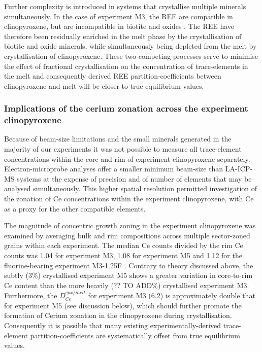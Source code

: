 \documentclass[final,authoryear,3p,times,twocolumn]{elsarticle}
\begin{document}
    Further complexity is introduced in systems that crystallise multiple minerals simultaneously. In the case of experiment M3, the REE are compatible in clinopyroxene, but are incompatible in biotite and oxides \citep[e.g.][]{Mahood1990,Schmidt1999}. The REE have therefore been residually enriched in the melt phase by the crystallisation of biotite and oxide minerals, while simultaneously being depleted from the melt by crystallisation of clinopyroxene. These two competing processes serve to minimise the effect of fractional crystallisation on the concentration of trace-elements in the melt and consequently derived REE partition-coefficients between clinopyroxene and melt will be closer to true equilibrium values.

\subsubsection{Implications of the cerium zonation across the experiment clinopyroxene}
Because of beam-size limitations and the small minerals generated in the majority of our experiments it was not possible to measure all trace-element concentrations within the core and rim of experiment clinopyroxene separately.
    Electron-microprobe analyses offer a smaller minimum beam-size than LA-ICP-MS systems at the expense of precision and of number of elements that may be analysed simultaneously. This higher spatial resolution permitted investigation of the zonation of Ce concentrations within the experiment clinopyroxene, with Ce as a proxy for the other compatible elements.


The magnitude of concentric growth zoning in the experiment clinopyroxene was examined by averaging bulk and rim compositions across multiple sector-zoned grains within each experiment. The median Ce counts divided by the rim Ce counts was 1.04 for experiment M3, 1.08 for experiment M5 and 1.12 for the fluorine-bearing experiment M3-1.25F \citep[see][]{Beard_PhD_Thesis}. Contrary to theory discussed above, the subtly (3\%) crystallised experiment M5 shows a greater variation in core-to-rim Ce content than the more heavily (?? TO ADD\%) crystallised experiment M3. Furthermore, the $D_{Ce}^{cpx/melt}$ for experiment M3 (6.2) is approximately double that for experiment M5 (see discussion below), which should further promote the formation of Cerium zonation in the clinopyroxene during crystallisation. Consequently it is possible that many existing experimentally-derived trace-element partition-coefficients are systematically offset from true equilibrium values.
\end{document}
